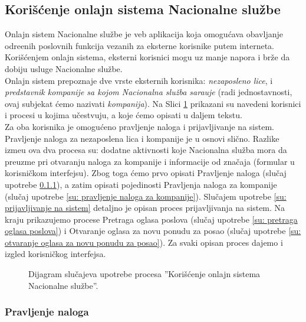 \subsection{Kori\v s\' cenje onlajn sistema Nacionalne slu\v zbe}

Onlajn sistem Nacionalne slu\v zbe je veb aplikacija koja omogu\' cava obavljanje odre\dj enih poslovnih funkcija vezanih za eksterne korisnike putem interneta. Kori\v s\' cenjem onlajn sistema, eksterni korisnici mogu uz manje napora i br\v ze da dobiju usluge Nacionalne slu\v zbe.\\

Onlajn sistem prepoznaje dve vrste eksternih korisnika: \textit{nezaposleno lice}, i \textit{predstavnik kompanije sa kojom Nacionalna slu\v zba sara\dj uje} (radi jednostavnosti, ovaj subjekat \'cemo nazivati \textit{kompanija}). Na Slici \ref{dsu: koriscenje onlajn sistema nacionalne sluzbe} prikazani su navedeni korisnici i procesi u kojima u\v cestvuju, a koje \'cemo opisati u daljem tekstu.\\

Za oba korisnika je omogu\' ceno pravljenje naloga i prijavljivanje na sistem. Pravljenje naloga za nezaposlena lica i kompanije je u osnovi sli\v cno. Razlike izme\dj u ova dva procesa su: dodatne aktivnosti koje Nacionalna slu\v zba mora da preuzme pri otvaranju naloga za kompanije i informacije od zna\v caja (formular u korisni\v ckom interfejsu). Zbog toga \' cemo prvo opisati Pravljenje naloga (slu\v caj upotrebe \ref{su: pravljenje naloga}), a zatim opisati pojedinosti Pravljenja naloga za kompanije (slu\v caj upotrebe \ref{su: pravljenje naloga za kompanije}). Slu\v cajem upotrebe \ref{su: prijavljivanje na sistem} detaljno je opisan proces prijavljivanja na sistem. Na kraju prikazujemo procese Pretraga oglasa poslova (slu\v caj upotrebe \ref{su: pretraga oglasa poslova}) i Otvaranje oglasa za novu ponudu za posao (slu\v caj upotrebe \ref{su: otvaranje oglasa za novu ponudu za posao}). Za svaki opisan proces dajemo i izgled korisni\v ckog interfejsa.

\begin{figure}[H]
	\centering
	
	\caption{Dijagram slu\v cajeva upotrebe procesa ''Kori\v s\' cenje onlajn sistema Nacionalne slu\v zbe''.}
	\label{dsu: koriscenje onlajn sistema nacionalne sluzbe}
\end{figure}

\subsubsection{Pravljenje naloga}
\label{su: pravljenje naloga}

